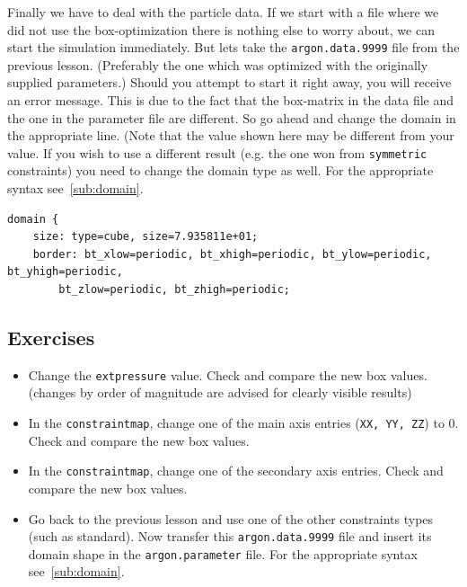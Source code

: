 Finally we have to deal with the particle data. If we start with a file where we did not use the box-optimization there is nothing else to worry about, we can start
the simulation immediately. But lets take the \texttt{argon.data.9999} file from the previous lesson. (Preferably the one which was optimized with the originally supplied parameters.) Should you attempt to start it right away, you will receive an error
message. This is due to the fact that the box-matrix in the data file and the one in the parameter file are different. So go ahead and change the domain in the
appropriate line.  (Note that the value shown here may be different from your value. If you wish to use a different result (e.g. the one won from \texttt{symmetric}
constraints) you need to change the domain type as well. For the appropriate syntax see~\ref{sub:domain}.

\begin{lstlisting}
domain {
    size: type=cube, size=7.935811e+01;
    border: bt_xlow=periodic, bt_xhigh=periodic, bt_ylow=periodic, bt_yhigh=periodic,
        bt_zlow=periodic, bt_zhigh=periodic;
\end{lstlisting}


\subsection{Exercises}
\begin{itemize}
 \item Change the \texttt{extpressure} value. Check and compare the new box values. (changes by order of magnitude are advised for clearly visible results)
 \item In the \texttt{constraintmap}, change one of the main axis entries (\texttt{XX, YY, ZZ}) to 0. Check and compare the new box values.
 \item In the \texttt{constraintmap}, change one of the secondary axis entries. Check and compare the new box values.
 \item Go back to the previous lesson and use one of the other constraints types (such as standard). Now transfer this \texttt{argon.data.9999} file and insert
 its domain shape in the \texttt{argon.parameter} file. For the appropriate syntax see~\ref{sub:domain}.
\end{itemize}

